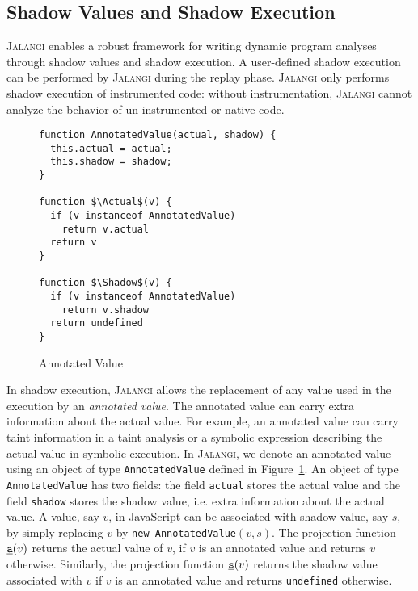 \documentclass{sig-alternate}
\def\jalangi{\textsc{Jalangi}}
\newcommand \usl [1] {\mbox{\underline{\tt #1}}\xspace}
\newcommand \Actual{\usl{a}}
\newcommand \Shadow{\usl{s}}
\begin{document}
\subsection{Shadow Values and Shadow Execution}
\label{sec:shadow-values-shadow}

\jalangi{} enables a robust framework for writing dynamic program analyses
through shadow values and shadow execution.  A user-defined shadow
execution can be performed by \jalangi{} during the replay phase.
\jalangi{} only performs shadow execution of instrumented code:
without instrumentation, \jalangi{} cannot analyze the behavior of
un-instrumented or native code.

\lstset{language=JavaScript}
\begin{figure}
  
{\scriptsize 
\begin{lstlisting}[mathescape]
function AnnotatedValue(actual, shadow) {
  this.actual = actual;
  this.shadow = shadow;
}

function $\Actual$(v) {
  if (v instanceof AnnotatedValue)
    return v.actual
  return v
}

function $\Shadow$(v) {
  if (v instanceof AnnotatedValue)
    return v.shadow
  return undefined
}
\end{lstlisting}
}
  \caption{Annotated Value}
  \label{fig:annot}
\end{figure}

In shadow execution, \jalangi{} allows the replacement of any value
used in the execution by an \emph{annotated value}.  The annotated
value can carry extra information about the actual value.  For
example, an annotated value can carry taint information in a taint
analysis or a symbolic expression describing the actual value in
symbolic execution.  In \jalangi{}, we denote an annotated value using
an object of type \texttt{AnnotatedValue} defined in
Figure~\ref{fig:annot}.  An object of type \texttt{AnnotatedValue} has
two fields: the field \texttt{actual} stores the actual value and the
field \texttt{shadow} stores the shadow value, i.e. extra information
about the actual value.  A value, say $v$, in JavaScript can be
associated with shadow value, say $s$, by simply replacing $v$ by
\texttt{new AnnotatedValue}$(v, s)$.  The projection function
$\Actual(v)$ returns the actual value of $v$, if $v$ is an annotated
value and returns $v$ otherwise.  Similarly, the projection function
$\Shadow(v)$ returns the shadow value associated with $v$ if $v$ is an
annotated value and returns \texttt{undefined} otherwise.
\end{document}
